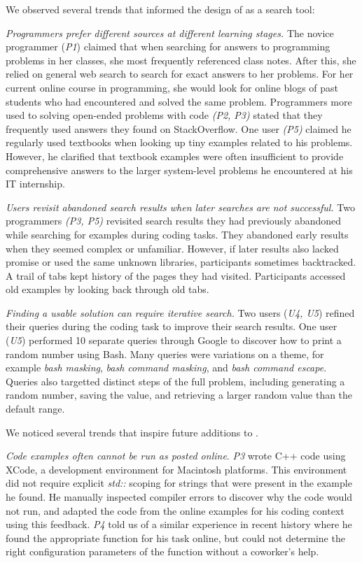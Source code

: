 We observed several trends that informed the design of \systemname{} as a search tool:

\emph{Programmers prefer different sources at different learning stages.}
The novice programmer (\emph{P1}) claimed that when searching for answers to programming problems in her classes, she most frequently referenced class notes.
After this, she relied on general web search to search for exact answers to her problems.
For her current online course in programming, she would look for online blogs of past students who had encountered and solved the same problem.
Programmers more used to solving open-ended problems with code \emph{(P2, P3)} stated that they frequently used answers they found on StackOverflow.
One user \emph{(P5)} claimed he regularly used textbooks when looking up tiny examples related to his problems.
However, he clarified that textbook examples were often insufficient to provide comprehensive answers to the larger system-level problems he encountered at his IT internship.

\emph{Users revisit abandoned search results when later searches are not successful.}
Two programmers \emph{(P3, P5)} revisited search results they had previously abandoned while searching for examples during coding tasks.
They abandoned early results when they seemed complex or unfamiliar.
However, if later results also lacked promise or used the same unknown libraries,  participants sometimes backtracked.
A trail of tabs kept history of the pages they had visited.
Participants accessed old examples by looking back through old tabs.

\emph{Finding a usable solution can require iterative search.}
Two users (\emph{U4, U5}) refined their queries during the coding task to improve their search results.
One user (\emph{U5}) performed 10 separate queries through Google to discover how to print a random number using Bash.
Many queries were variations on a theme, for example \emph{bash masking}, \emph{bash command masking}, and \emph{bash command escape}.
Queries also targetted distinct steps of the full problem, including generating a random number, saving the value, and retrieving a larger random value than the default range.

We noticed several trends that inspire future additions to \systemname{}.

\emph{Code examples often cannot be run as posted online}.
\emph{P3} wrote C++ code using XCode, a development environment for Macintosh platforms.
This environment did not require explicit \emph{std::} scoping for strings that were present in the example he found.
He manually inspected compiler errors to discover why the code would not run, and adapted the code from the online examples for his coding context using this feedback.
\emph{P4} told us of a similar experience in recent history where he found the appropriate function for his task online, but could not determine the right configuration parameters of the function without a coworker's help.

